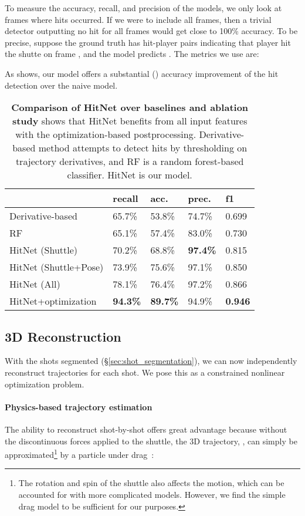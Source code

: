 To measure the accuracy, recall, and precision of the models, we only look at frames where hits occurred. If we were to include all frames, then a trivial detector outputting no hit for all frames would get close to 100\% accuracy. To be precise, suppose the ground truth has hit-player pairs  indicating that player  hit the shutte on frame , and the model predicts . The metrics we use are:

As  shows, our model offers a substantial () accuracy improvement of the hit detection over the naive model.




\begin{table}[t]
\caption{{\bf Comparison of HitNet over baselines and ablation study} shows that HitNet benefits from all input features with the optimization-based postprocessing. Derivative-based method attempts to detect hits by thresholding on trajectory derivatives, and RF is a random forest-based classifier. HitNet is our model. \label{tab:hit-detection}}
\centering
\begin{tabular}{l|llll}
\toprule
           & recall & acc. & prec. & f1 \\ 
\hline
Derivative-based     & 65.7\%       & 53.8\%       & 74.7\%        & 0.699 \\ 
\hline
RF                   & 65.1\%       & 57.4\%       & 83.0\%        & 0.730 \\
\hline
HitNet (Shuttle)      & 70.2\%      & 68.8\%       & {\bf 97.4\%}  & 0.815 \\
HitNet (Shuttle+Pose) & 73.9\%      & 75.6\%       & 97.1\%  & 0.850 \\
HitNet (All)          & 78.1\%      & 76.4\%       & 97.2\%  & 0.866 \\
\hline
HitNet+optimization  & {\bf 94.3\%} & {\bf 89.7\%} & 94.9\%        & {\bf 0.946} \\
\bottomrule
\end{tabular}
\end{table}


\subsection{3D Reconstruction}
\label{sec:3d-recon}

With the shots segmented (\S\ref{sec:shot_segmentation}), we can now independently reconstruct trajectories for each shot. We pose this as a constrained nonlinear optimization problem.

\paragraph{Physics-based trajectory estimation} The ability to reconstruct shot-by-shot offers great advantage because without the discontinuous forces applied to the shuttle, the 3D trajectory, , can simply be approximated\footnote{The rotation and spin of the shuttle also affects the motion, which can be accounted for with more complicated models. However, we find the simple drag model to be sufficient for our purposes.} by a particle under drag~\cite{cohen_physics_2015}:

